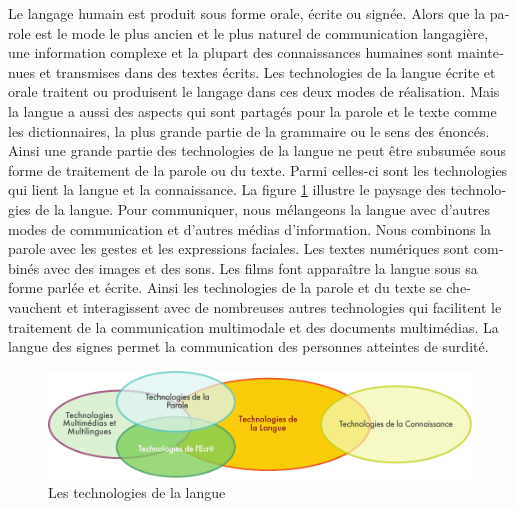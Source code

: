 \begin{french}
\begin{multicols}{2}
Le langage humain est produit sous forme orale,
écrite ou signée. Alors que la parole est le mode le plus ancien et le
plus naturel de communication langagière, une information complexe et
la plupart des connaissances humaines sont maintenues et transmises
dans des textes écrits. Les technologies de la langue écrite et orale
traitent ou produisent le langage dans ces deux modes de
réalisation. Mais la langue a aussi des aspects qui sont partagés pour
la parole et le texte comme les dictionnaires, la plus grande partie
de la grammaire ou le sens des énoncés. Ainsi une grande partie des
technologies de la langue ne peut être subsumée sous forme de
traitement de la parole ou du texte. Parmi celles-ci sont les
technologies qui lient la langue et la connaissance. La figure
\ref{fig:languagetechno} illustre le paysage des technologies de la
langue. Pour communiquer, nous mélangeons la langue avec d'autres
modes de communication et d'autres médias d'information. Nous
combinons la parole avec les gestes et les expressions faciales. Les
textes numériques sont combinés avec des images et des sons. Les films
font apparaître la langue sous sa forme parlée et écrite. Ainsi les
technologies de la parole et du texte se chevauchent et interagissent
avec de nombreuses autres technologies qui facilitent le traitement de
la communication multimodale et des documents multimédias.  La langue
des signes permet la communication des personnes atteintes de surdité.

\begin{figure}[!ht]

\begin{center}
 \includegraphics[width=\textwidth]{../_media/french/language_technologies} 
\caption{Les technologies de la langue}
\label{fig:languagetechno}
\end{center}
\vspace*{-.2cm}
\end{figure}




\end{multicols}
\end{french}

